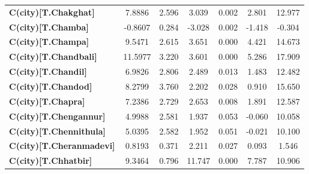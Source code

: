 \begin{center}
\begin{tabular}{lcccccc}
\textbf{C(city)[T.Chakghat]}                                                                        &       7.8886  &        2.596     &     3.039  &         0.002        &        2.801    &       12.977     \\
\textbf{C(city)[T.Chamba]}                                                                          &      -0.8607  &        0.284     &    -3.028  &         0.002        &       -1.418    &       -0.304     \\
\textbf{C(city)[T.Champa]}                                                                          &       9.5471  &        2.615     &     3.651  &         0.000        &        4.421    &       14.673     \\
\textbf{C(city)[T.Chandbali]}                                                                       &      11.5977  &        3.220     &     3.601  &         0.000        &        5.286    &       17.909     \\
\textbf{C(city)[T.Chandil]}                                                                         &       6.9826  &        2.806     &     2.489  &         0.013        &        1.483    &       12.482     \\
\textbf{C(city)[T.Chandod]}                                                                         &       8.2799  &        3.760     &     2.202  &         0.028        &        0.910    &       15.650     \\
\textbf{C(city)[T.Chapra]}                                                                          &       7.2386  &        2.729     &     2.653  &         0.008        &        1.891    &       12.587     \\
\textbf{C(city)[T.Chengannur]}                                                                      &       4.9988  &        2.581     &     1.937  &         0.053        &       -0.060    &       10.058     \\
\textbf{C(city)[T.Chennithula]}                                                                     &       5.0395  &        2.582     &     1.952  &         0.051        &       -0.021    &       10.100     \\
\textbf{C(city)[T.Cheranmadevi]}                                                                    &       0.8193  &        0.371     &     2.211  &         0.027        &        0.093    &        1.546     \\
\textbf{C(city)[T.Chhatbir]}                                                                        &       9.3464  &        0.796     &    11.747  &         0.000        &        7.787    &       10.906     \\

\end{tabular}
\end{center}
